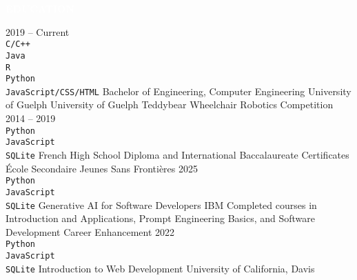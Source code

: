 \documentclass[9pt]{src/developercv} %
\begin{document}
\vspace{\baselineskip} %
\colorbox{cyan800}{\textcolor{white}{\MakeUppercase{\textbf{Education}}}}\\%

\begin{entrylist}
	\entry
		{2019 -- Current\\
		\footnotesize{\texttt{C/C++}}\hfill\\
		\footnotesize{\texttt{Java}}\hfill\\
		\footnotesize{\texttt{R}}\hfill\\
		\footnotesize{\texttt{Python}}\hfill\\
		\footnotesize{\texttt{JavaScript/CSS/HTML}}\hfill}
		{Bachelor of Engineering, Computer Engineering}
		{University of Guelph}
		{University of Guelph Teddybear Wheelchair Robotics Competition\hfill\\}
	\entry
		{2014 -- 2019\\
		\footnotesize{\texttt{Python}}\hfill\\
		\footnotesize{\texttt{JavaScript}}\hfill\\
		\footnotesize{\texttt{SQLite}}\hfill}
		{French High School Diploma and International Baccalaureate Certificates}
		{École Secondaire Jeunes Sans Frontières}
		{}
	\entry
		{2025\\
		\footnotesize{\texttt{Python}}\hfill\\
		\footnotesize{\texttt{JavaScript}}\hfill\\
		\footnotesize{\texttt{SQLite}}\hfill}
		{Generative AI for Software Developers}
		{IBM}
		{Completed courses in Introduction and Applications, Prompt Engineering Basics, and Software Development Career Enhancement}
	\entry
		{2022\\
		\footnotesize{\texttt{Python}}\hfill\\
		\footnotesize{\texttt{JavaScript}}\hfill\\
		\footnotesize{\texttt{SQLite}}\hfill}
		{Introduction to Web Development}
		{University of California, Davis}
		{}
\end{entrylist}

\end{document}
